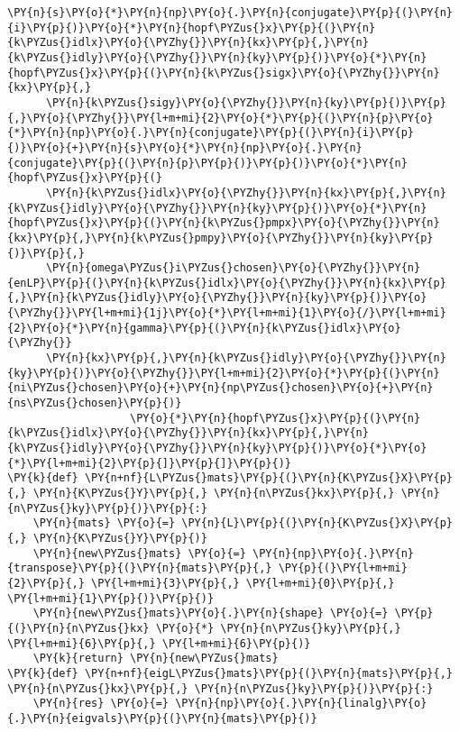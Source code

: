 \begin{Verbatim}[commandchars=\\\{\}]
      \PY{n}{s}\PY{o}{*}\PY{n}{np}\PY{o}{.}\PY{n}{conjugate}\PY{p}{(}\PY{n}{i}\PY{p}{)}\PY{o}{*}\PY{n}{hopf\PYZus{}x}\PY{p}{(}\PY{n}{k\PYZus{}idlx}\PY{o}{\PYZhy{}}\PY{n}{kx}\PY{p}{,}\PY{n}{k\PYZus{}idly}\PY{o}{\PYZhy{}}\PY{n}{ky}\PY{p}{)}\PY{o}{*}\PY{n}{hopf\PYZus{}x}\PY{p}{(}\PY{n}{k\PYZus{}sigx}\PY{o}{\PYZhy{}}\PY{n}{kx}\PY{p}{,}
      \PY{n}{k\PYZus{}sigy}\PY{o}{\PYZhy{}}\PY{n}{ky}\PY{p}{)}\PY{p}{,}\PY{o}{\PYZhy{}}\PY{l+m+mi}{2}\PY{o}{*}\PY{p}{(}\PY{n}{p}\PY{o}{*}\PY{n}{np}\PY{o}{.}\PY{n}{conjugate}\PY{p}{(}\PY{n}{i}\PY{p}{)}\PY{o}{+}\PY{n}{s}\PY{o}{*}\PY{n}{np}\PY{o}{.}\PY{n}{conjugate}\PY{p}{(}\PY{n}{p}\PY{p}{)}\PY{p}{)}\PY{o}{*}\PY{n}{hopf\PYZus{}x}\PY{p}{(}
      \PY{n}{k\PYZus{}idlx}\PY{o}{\PYZhy{}}\PY{n}{kx}\PY{p}{,}\PY{n}{k\PYZus{}idly}\PY{o}{\PYZhy{}}\PY{n}{ky}\PY{p}{)}\PY{o}{*}\PY{n}{hopf\PYZus{}x}\PY{p}{(}\PY{n}{k\PYZus{}pmpx}\PY{o}{\PYZhy{}}\PY{n}{kx}\PY{p}{,}\PY{n}{k\PYZus{}pmpy}\PY{o}{\PYZhy{}}\PY{n}{ky}\PY{p}{)}\PY{p}{,}
      \PY{n}{omega\PYZus{}i\PYZus{}chosen}\PY{o}{\PYZhy{}}\PY{n}{enLP}\PY{p}{(}\PY{n}{k\PYZus{}idlx}\PY{o}{\PYZhy{}}\PY{n}{kx}\PY{p}{,}\PY{n}{k\PYZus{}idly}\PY{o}{\PYZhy{}}\PY{n}{ky}\PY{p}{)}\PY{o}{\PYZhy{}}\PY{l+m+mi}{1j}\PY{o}{*}\PY{l+m+mi}{1}\PY{o}{/}\PY{l+m+mi}{2}\PY{o}{*}\PY{n}{gamma}\PY{p}{(}\PY{n}{k\PYZus{}idlx}\PY{o}{\PYZhy{}}
      \PY{n}{kx}\PY{p}{,}\PY{n}{k\PYZus{}idly}\PY{o}{\PYZhy{}}\PY{n}{ky}\PY{p}{)}\PY{o}{\PYZhy{}}\PY{l+m+mi}{2}\PY{o}{*}\PY{p}{(}\PY{n}{ni\PYZus{}chosen}\PY{o}{+}\PY{n}{np\PYZus{}chosen}\PY{o}{+}\PY{n}{ns\PYZus{}chosen}\PY{p}{)}
                   \PY{o}{*}\PY{n}{hopf\PYZus{}x}\PY{p}{(}\PY{n}{k\PYZus{}idlx}\PY{o}{\PYZhy{}}\PY{n}{kx}\PY{p}{,}\PY{n}{k\PYZus{}idly}\PY{o}{\PYZhy{}}\PY{n}{ky}\PY{p}{)}\PY{o}{*}\PY{o}{*}\PY{l+m+mi}{2}\PY{p}{]}\PY{p}{]}\PY{p}{)}
\PY{k}{def} \PY{n+nf}{L\PYZus{}mats}\PY{p}{(}\PY{n}{K\PYZus{}X}\PY{p}{,} \PY{n}{K\PYZus{}Y}\PY{p}{,} \PY{n}{n\PYZus{}kx}\PY{p}{,} \PY{n}{n\PYZus{}ky}\PY{p}{)}\PY{p}{:}
    \PY{n}{mats} \PY{o}{=} \PY{n}{L}\PY{p}{(}\PY{n}{K\PYZus{}X}\PY{p}{,} \PY{n}{K\PYZus{}Y}\PY{p}{)}
    \PY{n}{new\PYZus{}mats} \PY{o}{=} \PY{n}{np}\PY{o}{.}\PY{n}{transpose}\PY{p}{(}\PY{n}{mats}\PY{p}{,} \PY{p}{(}\PY{l+m+mi}{2}\PY{p}{,} \PY{l+m+mi}{3}\PY{p}{,} \PY{l+m+mi}{0}\PY{p}{,} \PY{l+m+mi}{1}\PY{p}{)}\PY{p}{)}
    \PY{n}{new\PYZus{}mats}\PY{o}{.}\PY{n}{shape} \PY{o}{=} \PY{p}{(}\PY{n}{n\PYZus{}kx} \PY{o}{*} \PY{n}{n\PYZus{}ky}\PY{p}{,} \PY{l+m+mi}{6}\PY{p}{,} \PY{l+m+mi}{6}\PY{p}{)}
    \PY{k}{return} \PY{n}{new\PYZus{}mats}
\PY{k}{def} \PY{n+nf}{eigL\PYZus{}mats}\PY{p}{(}\PY{n}{mats}\PY{p}{,} \PY{n}{n\PYZus{}kx}\PY{p}{,} \PY{n}{n\PYZus{}ky}\PY{p}{)}\PY{p}{:}
    \PY{n}{res} \PY{o}{=} \PY{n}{np}\PY{o}{.}\PY{n}{linalg}\PY{o}{.}\PY{n}{eigvals}\PY{p}{(}\PY{n}{mats}\PY{p}{)}

\end{Verbatim}
